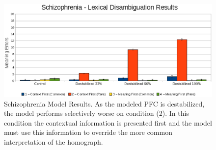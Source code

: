 


\begin{figure}[tp]
\begin{center}
	\includegraphics[width=140mm]{graphs/schiz_lexamb_results.eps}
\end{center}
\caption{Schizophrenia Model Results. As the modeled PFC is destabilized, the model performs selectively worse on condition (2).  In this condition the contextual information is presented first and the model must use this information to override the more common interpretation of the homograph. } 
\label{Schiz-Amb-Results}
\end{figure} 

